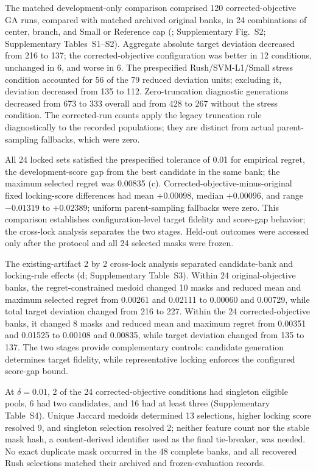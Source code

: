The matched development-only comparison comprised 120 corrected-objective GA runs, compared with matched archived original banks, in 24 combinations of center, branch, and Small or Reference cap (; Supplementary Fig.~S2; Supplementary Tables~S1--S2). Aggregate absolute target deviation decreased from 216 to 137; the corrected-objective configuration was better in 12 conditions, unchanged in 6, and worse in 6. The prespecified Rush/SVM-L1/Small stress condition accounted for 56 of the 79 reduced deviation units; excluding it, deviation decreased from 135 to 112. Zero-truncation diagnostic generations decreased from 673 to 333 overall and from 428 to 267 without the stress condition. The corrected-run counts apply the legacy truncation rule diagnostically to the recorded populations; they are distinct from actual parent-sampling fallbacks, which were zero.

All 24 locked sets satisfied the prespecified tolerance of 0.01 for empirical regret, the development-score gap from the best candidate in the same bank; the maximum selected regret was 0.00835 (c). Corrected-objective-minus-original fixed locking-score differences had mean \(+0.00098\), median \(+0.00096\), and range \(-0.01319\) to \(+0.02389\); uniform parent-sampling fallbacks were zero. This comparison establishes configuration-level target fidelity and score-gap behavior; the cross-lock analysis separates the two stages. Held-out outcomes were accessed only after the protocol and all 24 selected masks were frozen.

The existing-artifact 2 by 2 cross-lock analysis separated candidate-bank and locking-rule effects (d; Supplementary Table~S3). Within 24 original-objective banks, the regret-constrained medoid changed 10 masks and reduced mean and maximum selected regret from 0.00261 and 0.02111 to 0.00060 and 0.00729, while total target deviation changed from 216 to 227. Within the 24 corrected-objective banks, it changed 8 masks and reduced mean and maximum regret from 0.00351 and 0.01525 to 0.00108 and 0.00835, while target deviation changed from 135 to 137. The two stages provide complementary controls: candidate generation determines target fidelity, while representative locking enforces the configured score-gap bound.

At \(\delta=0.01\), 2 of the 24 corrected-objective conditions had singleton eligible pools, 6 had two candidates, and 16 had at least three (Supplementary Table~S4). Unique Jaccard medoids determined 13 selections, higher locking score resolved 9, and singleton selection resolved 2; neither feature count nor the stable mask hash, a content-derived identifier used as the final tie-breaker, was needed. No exact duplicate mask occurred in the 48 complete banks, and all recovered Rush selections matched their archived and frozen-evaluation records.

